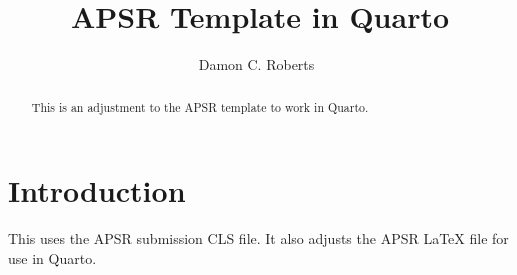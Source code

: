 \documentclass[biblatex,blind]{apsr_submission}
\title{APSR Template in Quarto}
\author{Damon C. Roberts~\orcidlink{0000-0002-4360-3675}}
        {University of Colorado Boulder}
        {{Corresponding author. Email: \url{damon.roberts-1@colorado.edu} \\}{Replication materials: \url{https://github.com/DamonCharlesRoberts}}}
\begin{document}
\begin{frontmatter}
\begin{abstract}
    This is an adjustment to the APSR template to work in Quarto.
\end{abstract}
\end{frontmatter}
\newpage

\hypertarget{introduction}{%
\section{Introduction}\label{introduction}}

This uses the APSR submission CLS file. It also adjusts the APSR LaTeX
file for use in Quarto.

%

\newpage
\printbibliography
\end{document}
